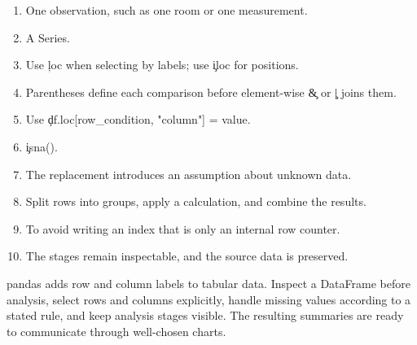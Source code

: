 
\begin{enumerate}
    \item One observation, such as one room or one measurement.
    \item A Series.
    \item Use \c{loc} when selecting by labels; use \c{iloc} for positions.
    \item Parentheses define each comparison before element-wise \c{&} or \c{|} joins them.
    \item Use \c{df.loc[row_condition, "column"] = value}.
    \item \c{isna()}.
    \item The replacement introduces an assumption about unknown data.
    \item Split rows into groups, apply a calculation, and combine the results.
    \item To avoid writing an index that is only an internal row counter.
    \item The stages remain inspectable, and the source data is preserved.
\end{enumerate}

\begin{tcolorbox}[title=Chapter summary,colframe=orange,colback=white,arc=2mm]
pandas adds row and column labels to tabular data. Inspect a DataFrame before
analysis, select rows and columns explicitly, handle missing values according
to a stated rule, and keep analysis stages visible. The resulting summaries
are ready to communicate through well-chosen charts.
\end{tcolorbox}

